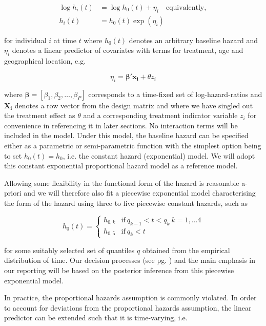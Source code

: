 \documentclass[a4paper]{article}
\begin{document}
\begin{align*}
\log h_i(t) &= \log h_0(t) + \eta_i \quad \text{equivalently},  \\
h_i(t) &= h_0(t) \exp(\eta_i)
\end{align*}

for individual $i$ at time $t$ where $h_0(t)$ denotes an arbitrary baseline hazard and $\eta_i$ denotes a linear predictor of covariates with terms for treatment, age and geographical location, e.g.

\begin{equation}
\eta_i = \boldsymbol{\beta}' \boldsymbol{x_i} + \theta z_i
\end{equation}

where $\boldsymbol{\beta} = [\beta_1, \beta_2, \dots, \beta_P]$ corresponds to a time-fixed set of log-hazard-ratios and $\boldsymbol{X_i}$ denotes a row vector from the design matrix and where we have singled out the treatment effect as $\theta$ and a corresponding treatment indicator variable $z_i$ for convenience in referencing it in later sections.
No interaction terms will be included in the model.
Under this model, the baseline hazard can be specified either as a parametric or semi-parametric function with the simplest option being to set $h_0(t) = h_0$, i.e. the constant hazard (exponential) model. 
We will adopt this constant exponential proportional hazard model as a reference model.

Allowing some flexibility in the functional form of the hazard is reasonable a-priori and we will therefore also fit a piecewise exponential model characterising the form of the hazard using three to five piecewise constant hazards, such as

\begin{equation}
h_0(t) = \begin{cases}
      h_{0,k} & \text{if}\ q_{k-1} < t < q_k \ k = 1, \dots 4 \\
      h_{0,5} & \text{if}\ q_k < t
    \end{cases}
\end{equation}

for some suitably selected set of quantiles $q$ obtained from the empirical distribution of time.
Our decision processes (see pg. \pageref{trial-adaptations-and-decision-procedures}) and the main emphasis in our reporting will be based on the posterior inference from this piecewise exponential model.

In practice, the proportional hazards assumption is commonly violated.
In order to account for deviations from the proportional hazards assumption, the linear predictor can be extended such that it is time-varying, i.e. 
\end{document}
